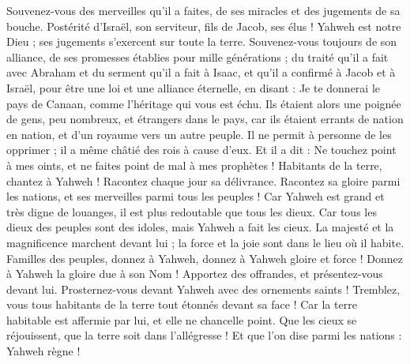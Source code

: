 \begin{multicols}{2}
Souvenez-vous des merveilles qu'il a faites, de ses miracles et des jugements de sa bouche.
Postérité d'Israël, son serviteur, fils de Jacob, ses élus !
Yahweh est notre Dieu ; ses jugements s'exercent sur toute la terre.
Souvenez-vous toujours de son alliance, de ses promesses établies pour mille générations ;
du traité qu'il a fait avec Abraham et du serment qu'il a fait à Isaac,
et qu'il a confirmé à Jacob et à Israël, pour être une loi et une alliance éternelle,
en disant : Je te donnerai le pays de Canaan, comme l'héritage qui vous est échu.
Ils étaient alors une poignée de gens, peu nombreux, et étrangers dans le pays,
car ils étaient errants de nation en nation, et d'un royaume vers un autre peuple.
Il ne permit à personne de les opprimer ; il a même châtié des rois à cause d'eux.
Et il a dit : Ne touchez point à mes oints, et ne faites point de mal à mes prophètes !
Habitants de la terre, chantez à Yahweh ! Racontez chaque jour sa délivrance.
Racontez sa gloire parmi les nations, et ses merveilles parmi tous les peuples !
Car Yahweh est grand et très digne de louanges, il est plus redoutable que tous les dieux.
Car tous les dieux des peuples sont des idoles, mais Yahweh a fait les cieux.
La majesté et la magnificence marchent devant lui ; la force et la joie sont dans le lieu où il habite.
Familles des peuples, donnez à Yahweh, donnez à Yahweh gloire et force !
Donnez à Yahweh la gloire due à son Nom ! Apportez des offrandes, et présentez-vous devant lui. Prosternez-vous devant Yahweh avec des ornements saints !
Tremblez, vous tous habitants de la terre tout étonnés devant sa face ! Car la terre habitable est affermie par lui, et elle ne chancelle point.
Que les cieux se réjouissent, que la terre soit dans l'allégresse ! Et que l'on dise parmi les nations : Yahweh règne !

\end{multicols}
